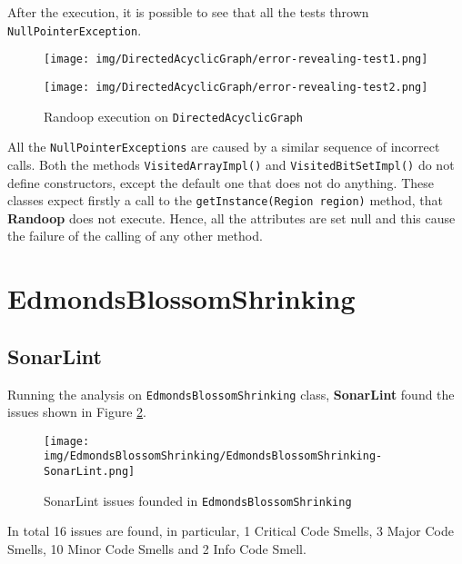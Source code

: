 \documentclass[a4paper,12pt]{article} %
\begin{document}
After the execution, it is possible to see that all the tests thrown \texttt{NullPointerException}. 

\begin{figure}[H]
	\centering
	\begin{minipage}[b]{.9\textwidth}
		\texttt{[image: img/DirectedAcyclicGraph/error-revealing-test1.png]}	
	\end{minipage}
	\begin{minipage}[b]{.9\textwidth}
		\texttt{[image: img/DirectedAcyclicGraph/error-revealing-test2.png]}	
	\end{minipage}
\caption{Randoop execution on \texttt{DirectedAcyclicGraph}}
\label{fig:randtest2-graph}
\end{figure}



	
	
All the \texttt{NullPointerExceptions} are caused by a similar sequence of incorrect calls.
Both the methods \texttt{VisitedArrayImpl()} and \texttt{VisitedBitSetImpl()} do not define constructors, except the default one that does not do anything. 
These classes expect firstly a call to the \texttt{getInstance(Region region)} method, that \textbf{Randoop} does not execute. 
Hence, all the attributes are set null and this cause the failure of the calling of any other method.

	\section{EdmondsBlossomShrinking}
	
	\subsection*{SonarLint}
	Running the analysis on \texttt{EdmondsBlossomShrinking} class, \textbf{SonarLint} found the issues shown in Figure \ref{fig:sonar-ed}.
	
	\begin{figure}[H]
		\centering
		\texttt{[image: img/EdmondsBlossomShrinking/EdmondsBlossomShrinking-SonarLint.png]}	
		\caption{SonarLint issues founded in \texttt{EdmondsBlossomShrinking}}
		\label{fig:sonar-ed}
	\end{figure}
	
	In total 16 issues are found, in particular, 1 Critical Code Smells, 3 Major Code Smells, 10 Minor Code Smells and 2 Info Code Smell.
	
\end{document}
